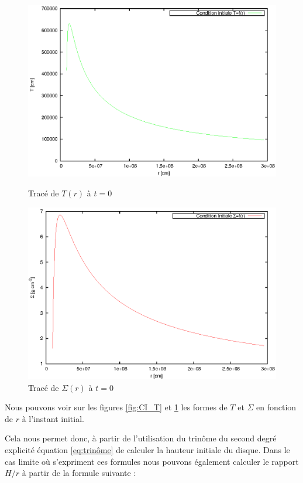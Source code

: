  \begin{figure}[ht]
   \begin{minipage}[c]{.46\linewidth}
      \includegraphics[scale=0.6]{ic_T.eps}
      \caption{Tracé de $T(r)$ à $t = 0$}\label{fig:CI_T}
   \end{minipage} \hfill
   \begin{minipage}[c]{.46\linewidth}
      \includegraphics[scale=0.6]{ic_Sig.eps}
      \caption{Tracé de $\Sigma(r)$ à $t = 0$}\label{fig:CI_Sig}
   \end{minipage}
\end{figure} 

Nous pouvons voir sur les figures \ref{fig:CI_T} et \ref{fig:CI_Sig} les formes
de $T$ et $\Sigma$ en fonction de $r$ à l'instant initial.

Cela nous permet donc, à partir de l'utilisation du trinôme du second degré
explicité équation \eqref{eq:trinôme} de calculer la hauteur initiale du
disque. Dans le cas limite où s'expriment ces formules nous pouvons également
calculer le rapport $H/r$ à partir de la formule suivante : 

